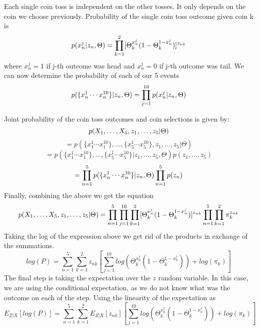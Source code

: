 \documentclass[11pt]{article}
\theoremstyle{plain}
\theoremstyle{definition}
\begin{document}
Each single coin toss is independent on the other tosses. It only depends on the coin we choose previously. Probability of the single coin toss outcome given coin k is
\begin{equation}
p(x_n^j|\boldmath{z_n},\Theta)=\prod_{k=1}^{2}[\Theta_k^{x_n^j}(1-\Theta_k^{1-x_n^j})]^{z_{nk}}
\end{equation}
where $x_n^j=1$ if j-th outcome was head and $x_n^j=0$ if j-th outcome was tail. We can now determine the probability of each of our 5 events
\begin{equation}
p(\{x^1_n\cdots x^{10}_n\}|z_n,\Theta)=\prod_{j=1}^{10}p(x_n^j|\boldmath{z_n},\Theta)
\end{equation}

Joint probability of the coin toss outcomes and coin selections is given by:
\begin{equation}
p(X_1,\dots, X_5,\boldmath{z_1,\dots,z_5}|\Theta) 
\end{equation}
\begin{equation}
= p(\{x^1_1\cdots x^{10}_1\},\dots,\{x^1_5\cdots x^{10}_5\}, z_1,\dots,z_5|\Theta)
\end{equation}
\begin{equation}
= p(\{x^1_1\cdots x^{10}_1\},\dots,\{x^1_5\cdots x^{10}_5\}| z_1,\dots,z_5,\Theta)p(z_1,\dots,z_5)
\end{equation}
\begin{equation}
=\prod_{n=1}^{5}p(\{x^1_n\cdots x^{10}_n\}|z_n,\Theta) \prod_{n=1}^{5}p(\boldmath{z_n})
\end{equation}
Finally, combining the above we get the equation
\begin{equation}
p(X_1,\dots, X_5,\boldmath{z_1,\dots,z_5}|\Theta) = 
\prod_{n=1}^{5}\prod_{j=1}^{10}\prod_{k=1}^{2}[\Theta_k^{x_n^j}(1-\Theta_k^{1-x_n^j})]^{z_{nk}}\prod_{n=1}^{5}\prod_{k=1}^{2}\pi_{k}^{z_{nk}}
\end{equation}
Taking the log of the expression above we get rid of the products in exchange of the summations.
\begin{equation}
log(P) = 
\sum_{n=1}^{5}\sum_{k=1}^{2}z_{nk}[\sum_{j=1}^{10}log(\Theta_k^{x_n^j}(1-\Theta_k^{1-x_n^j}))+log(\pi_{k})]
\end{equation}
The final step is taking the expectation over the $z$ random variable. In this case, we are using the conditional expectation, as we do not
know what was the outcome on each of the step. Using the linearity of the expectation as
\begin{equation}
E_{Z|X}[log(P)] = 
\sum_{n=1}^{5}\sum_{k=1}^{2}E_{Z|X}[z_{nk}][\sum_{j=1}^{10}log(\Theta_k^{x_n^j}(1-\Theta_k^{1-x_n^j}))+log(\pi_{k})]
\end{equation}
\end{document}
